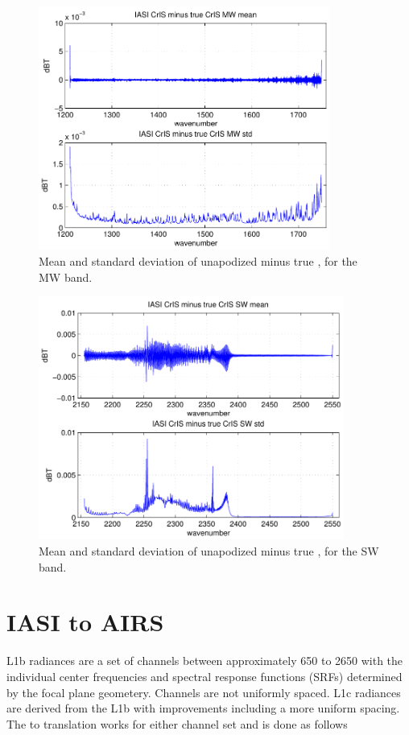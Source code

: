 \documentclass[12pt]{article}
\begin{document}
\begin{figure}
  \centering
  \includegraphics[height=8cm]{figures/iasi_cris_mw_1.pdf}
  \caption{Mean and standard deviation of unapodized {\iasi} {\cris}
    minus true {\cris}, for the {\cris} MW band.}
  \label{icmw1}
\end{figure}

\begin{figure}
  \centering
  \includegraphics[height=8cm]{figures/iasi_cris_sw_1.pdf}
  \caption{Mean and standard deviation of unapodized {\iasi} {\cris}
    minus true {\cris}, for the {\cris} SW band.}
  \label{icsw1}
\end{figure}

\FloatBarrier


\section{IASI to AIRS}

{\airs} L1b radiances are a set of channels between approximately
650 to 2650 {\wn} with the individual center frequencies and
spectral response functions (SRFs) determined by the focal plane
geometery.  Channels are not uniformly spaced.  {\airs} L1c
radiances are derived from the L1b with improvements including a
more uniform spacing.  The {\iasi} to {\airs} translation works for
either channel set and is done as follows
\end{document}
